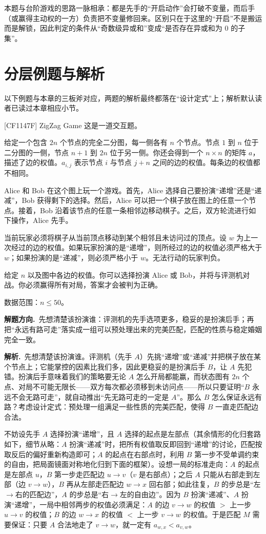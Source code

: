 \documentclass[UTF8,a4paper,11pt,oneside,openany,fontset=fandol]{ctexbook}
\theoremstyle{definition}
\newcommand{\sol}{\par\noindent\textbf{解析.}\ }
\newcommand{\hint}{\par\noindent\textbf{解题方向.}\ }
\begin{document}
本题与台阶游戏的思路一脉相承：都是先手的“开启动作”会打破不变量，而后手（或赢得主动权的一方）负责把不变量修回来。区别只在于这里的“开启”不是搬运而是解锁，因此判定的条件从“奇数级异或和”变成“是否存在异或和为 $0$ 的子集”。

\section{分层例题与解析}

以下例题与本章的三板斧对应，两题的解析最终都落在“设计定式”上；解析默认读者已读过本章相应小节。

\begin{problem}{[CF1147F] ZigZag Game}
这是一道交互题。

给定一个包含 $2n$ 个节点的完全二分图，每一侧各有 $n$ 个节点。节点 $1$ 到 $n$ 位于二分图的一侧，节点 $n+1$ 到 $2n$ 位于另一侧。你还会得到一个 $n\times n$ 的矩阵 $a$，描述了边的权值。$a_{i,j}$ 表示节点 $i$ 与节点 $j+n$ 之间的边的权值。每条边的权值都不相同。

Alice 和 Bob 在这个图上玩一个游戏。首先，Alice 选择自己要扮演“递增”还是“递减”，Bob 获得剩下的选择。然后，Alice 可以把一个棋子放在图上的任意一个节点。接着，Bob 沿着该节点的任意一条相邻边移动棋子。之后，双方轮流进行如下操作，Alice 先手。

当前玩家必须将棋子从当前顶点移动到某个相邻且未访问过的顶点。设 $w$ 为上一次经过的边的权值。如果玩家扮演的是“递增”，则所经过的边的权值必须严格大于 $w$；如果扮演的是“递减”，则必须严格小于 $w$。无法行动的玩家判负。

给定 $n$ 以及图中各边的权值。你可以选择扮演 Alice 或 Bob，并将与评测机对战。你必须赢得所有对局，答案才会被判为正确。

数据范围：$n\le50$。
\end{problem}

\hint 先想清楚该扮演谁：评测机的先手选项更多，稳妥的是扮演后手；再把“永远有路可走”落实成一组可以预处理出来的完美匹配，匹配的性质与稳定婚姻完全一致。

\sol 先想清楚该扮演谁。评测机（先手 $A$）先挑“递增”或“递减”并把棋子放在某个节点上；它能掌控的因素比我们多，因此更稳妥的是扮演后手 $B$，让 $A$ 先犯错。扮演后手意味着我们的策略要无论 $A$ 怎么开局都能赢，而状态图有 $2n$ 个点、对局不可能无限长——双方每次都必须移到未访问点——所以只要证明“$B$ 永远不会无路可走”，就自动推出“先无路可走的一定是 $A$”。那么 $B$ 怎么保证永远有路？考虑设计定式：预处理一组满足一些性质的完美匹配，使得 $B$ 一直走匹配边合法。

不妨设先手 $A$ 选择扮演“递增”，且 $A$ 选择的起点是左部点（其余情形的化归套路如下，细节从略：$A$ 扮演“递减”时，把所有权值取反即回到“递增”的讨论，匹配按取反后的偏好重新构造即可；$A$ 的起点在右部点时，利用 $B$ 第一步不受单调约束的自由，把局面镜面对称地化归到下面的框架）。设想一局的标准走向：$A$ 的起点是左部点 $u$，$B$ 第一步走匹配边 $u\to v$（$v$ 是右部点）；之后 $A$ 只能从右部走到左部（边 $v\to w$），$B$ 再从左部走匹配边 $w\to x$ 回右部；如此往复，$B$ 的步总是“左$\to$右的匹配边”，$A$ 的步总是“右$\to$左的自由边”。因为 $B$ 扮演“递减”、$A$ 扮演“递增”，一局中相邻两步的权值必须满足：$A$ 的边 $v\to w$ 的权值 $>$ 上一步 $u\to v$ 的权值；$B$ 的边 $w\to x$ 的权值 $<$ 上一步 $v\to w$ 的权值。于是匹配 $M$ 需要保证：只要 $A$ 合法地走了 $v\to w$，就一定有 $a_{w,x}<a_{v,w}$。
\end{document}
